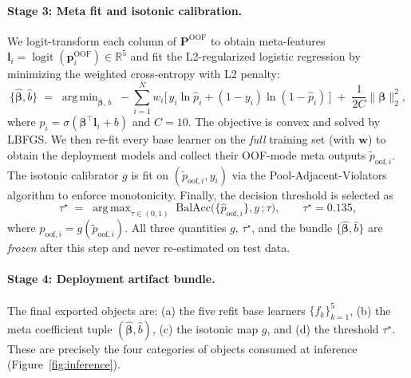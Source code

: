 \documentclass[11pt,a4paper]{article}
\newcommand{\Pof}{\mathbf{P}^{\mathrm{OOF}}}
\newcommand{\logit}{\operatorname{logit}}
\newcommand{\RR}{\mathbb{R}}
\newcommand{\ptilde}{\tilde p}
\newcommand{\phat}{\hat p}
\newcommand{\taustar}{\tau^{\star}}
\DeclareMathOperator*{\argmin}{arg\,min}
\DeclareMathOperator*{\argmax}{arg\,max}
\begin{document}
\paragraph{Stage 3: Meta fit and isotonic calibration.}
We logit-transform each column of $\Pof$ to obtain meta-features
$\mathbf{l}_i = \logit(\mathbf{p}_i^{\mathrm{OOF}})\in\RR^{5}$ and fit
the L2-regularized logistic regression by minimizing the weighted
cross-entropy with L2 penalty:
\begin{equation}
\label{eq:meta-objective}
\{\hat{\bm\beta},\hat b\}
\;=\;
\argmin_{\bm\beta,\,b}\;
-\sum_{i=1}^{N} w_i
\bigl[\,y_i\ln\hat p_i + (1-y_i)\ln(1-\hat p_i)\,\bigr]
\;+\;\frac{1}{2C}\|\bm\beta\|_2^{2},
\end{equation}
where $\hat p_i = \sigma(\bm\beta^{\!\top}\mathbf{l}_i + b)$ and
$C=10$. The objective is convex and solved by LBFGS. We then re-fit
every base learner on the \emph{full} training set (with $\mathbf{w}$)
to obtain the deployment models and collect their OOF-mode meta outputs
$\ptilde_{\mathrm{oof},i}$. The isotonic calibrator $g$ is fit on
$(\ptilde_{\mathrm{oof},i}, y_i)$ via the Pool-Adjacent-Violators
algorithm to enforce monotonicity. Finally, the decision threshold is
selected as
\[
\taustar \;=\; \argmax_{\tau\in(0,1)}\;
\mathrm{BalAcc}\!\bigl(\{\phat_{\mathrm{oof},i}\}, y\,;\tau\bigr),
\qquad \taustar = 0.135,
\]
where $\phat_{\mathrm{oof},i} = g(\ptilde_{\mathrm{oof},i})$. All three
quantities $g$, $\taustar$, and the bundle $\{\hat{\bm\beta},\hat b\}$
are \emph{frozen} after this step and never re-estimated on test data.

\paragraph{Stage 4: Deployment artifact bundle.}
The final exported objects are: (a) the five refit base learners
$\{f_k\}_{k=1}^{5}$, (b) the meta coefficient tuple $(\hat{\bm\beta},\hat b)$,
(c) the isotonic map $g$, and (d) the threshold $\taustar$. These are
precisely the four categories of objects consumed at inference
(Figure~\ref{fig:inference}).
\end{document}
